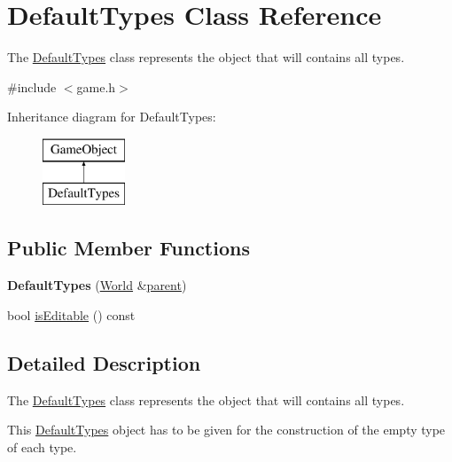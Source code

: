 \hypertarget{class_default_types}{\section{\-Default\-Types \-Class \-Reference}
\label{class_default_types}
}


\-The \hyperlink{class_default_types}{\-Default\-Types} class represents the object that will contains all types.  




{\ttfamily \#include $<$game.\-h$>$}

\-Inheritance diagram for \-Default\-Types\-:\begin{figure}[H]
\begin{center}
\leavevmode
\includegraphics[height=2.000000cm]{class_default_types}
\end{center}
\end{figure}
\subsection*{\-Public \-Member \-Functions}
\begin{DoxyCompactItemize}
\item 
\hypertarget{class_default_types_ae429a10f1aa1c005f0e53dad919b4e44}{{\bfseries \-Default\-Types} (\hyperlink{class_world}{\-World} \&\hyperlink{class_game_object_af3deaf39cde23c189765634e32e95bb4}{parent})}\label{class_default_types_ae429a10f1aa1c005f0e53dad919b4e44}

\item 
bool \hyperlink{class_default_types_a84bb7c988cf228a99f56676c50adedcd}{is\-Editable} () const 
\end{DoxyCompactItemize}


\subsection{\-Detailed \-Description}
\-The \hyperlink{class_default_types}{\-Default\-Types} class represents the object that will contains all types. 

\-This \hyperlink{class_default_types}{\-Default\-Types} object has to be given for the construction of the empty type of each type. 

